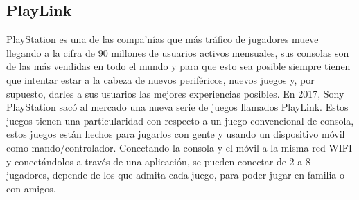 \subsection{PlayLink}
\label{cap2:subsec:PlayLink}

PlayStation es una de las compa'n\'ias que m\'as tr\'afico de jugadores mueve llegando a la cifra de 90 millones de usuarios activos mensuales, sus consolas son de las m\'as vendidas en todo el mundo y para que esto sea posible siempre tienen que intentar estar a la cabeza de nuevos perif\'ericos, nuevos juegos y, por supuesto, darles a sus usuarios las mejores experiencias posibles. En 2017, Sony PlayStation sac\'o al mercado una nueva serie de juegos llamados PlayLink. Estos juegos tienen una particularidad con respecto a un juego convencional de consola, estos juegos est\'an hechos para jugarlos con gente y usando un dispositivo m\'ovil como mando/controlador. Conectando la consola y el m\'ovil a la misma red WIFI y conect\'andolos a trav\'es de una aplicaci\'on, se pueden conectar de 2 a 8 jugadores, depende de los que admita cada juego, para poder jugar en familia o con amigos.


